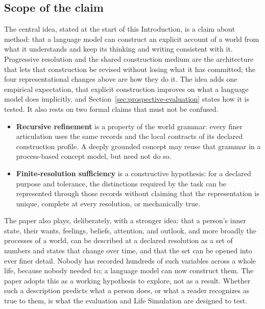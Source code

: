 \documentclass[11pt,a4paper]{article}
\begin{document}
\subsection{Scope of the claim}
\label{sec:scope}

The central idea, stated at the start of this Introduction, is a claim about
method: that a language model can construct an explicit account of a world from
what it understands and keep its thinking and writing consistent with it.
Progressive resolution and the shared construction medium are the architecture
that lets that construction be revised without losing what it has committed;
the four representational changes above are how they do it. The idea adds one
empirical expectation, that explicit construction improves on what a language
model does implicitly, and Section~\ref{sec:prospective-evaluation} states how
it is tested. It also rests on two formal claims that must not be confused.

\begin{itemize}
  \item \textbf{Recursive refinement} is a property of the world grammar:
    every finer articulation uses the same records and the local contracts of
    its declared construction profile. A deeply grounded concept may reuse that
    grammar in a process-based concept model, but need not do so.
  \item \textbf{Finite-resolution sufficiency} is a constructive hypothesis:
    for a declared purpose and tolerance, the distinctions required by the
    task can be represented through those records without claiming that the
    representation is unique, complete at every resolution, or mechanically true.
\end{itemize}

The paper also plays, deliberately, with a stronger idea: that a person's inner
state, their wants, feelings, beliefs, attention, and outlook, and more broadly
the processes of a world, can be described at a declared resolution as a set of
numbers and states that change over time, and that the set can be opened into
ever finer detail. Nobody has recorded hundreds of such variables across a whole
life, because nobody needed to; a language model can now construct them. The
paper adopts this as a working hypothesis to explore, not as a result. Whether
such a description predicts what a person does, or what a reader recognizes as
true to them, is what the evaluation and Life Simulation are designed to test.
\end{document}
